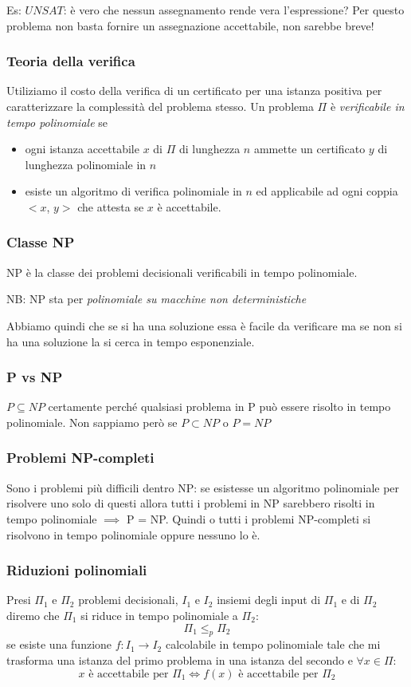 Es: $UNSAT$: è vero che nessun assegnamento rende vera l'espressione? Per questo problema non basta fornire un assegnazione accettabile, non sarebbe breve!

\subsubsection{Teoria della verifica}
Utiliziamo il costo della verifica di un certificato per una istanza positiva per caratterizzare la complessità del problema stesso. Un problema $\Pi$ è \emph{verificabile in tempo polinomiale} se
\begin{itemize}
    \item ogni istanza accettabile $x$ di $\Pi$ di lunghezza $n$ ammette un certificato $y$ di lunghezza polinomiale in $n$
    \item esiste un algoritmo di verifica polinomiale in $n$ ed applicabile ad ogni coppia $<x$, $y>$ che attesta se $x$ è accettabile.
\end{itemize}


\subsubsection{Classe NP}
NP è la classe dei problemi decisionali verificabili in tempo polinomiale.

NB: NP sta per \emph{polinomiale su macchine non deterministiche}

Abbiamo quindi che se si ha una soluzione essa è facile da verificare ma se non si ha una soluzione la si cerca in tempo esponenziale.

\subsubsection{P vs NP}
$P \subseteq NP$ certamente perché qualsiasi problema in P può essere risolto in tempo polinomiale. Non sappiamo però se $P \subset NP$ o $P = NP$


\subsubsection{Problemi NP-completi}
Sono i problemi più difficili dentro NP: se esistesse un algoritmo polinomiale per risolvere uno solo di questi allora tutti i problemi in NP sarebbero risolti in tempo polinomiale $\implies$ P = NP. Quindi o tutti i problemi NP-completi si risolvono in tempo polinomiale oppure nessuno lo è.

\subsubsection{Riduzioni polinomiali}
Presi $\Pi_{1}$ e $\Pi_{2}$ problemi decisionali, $I_{1}$ e $I_{2}$ insiemi degli input di $\Pi_{1}$ e di $\Pi_{2}$ diremo che $\Pi_{1}$ si riduce in tempo polinomiale a $\Pi_{2}$:
$$ \Pi_{1} \leq_{p} \Pi_{2} $$
se esiste una funzione $f:I_{1} \longrightarrow I_{2}$ calcolabile in tempo polinomiale tale che mi trasforma una istanza del primo problema in una istanza del secondo e $\forall x \in \Pi$:
$$ x \text{ è accettabile per } \Pi_{1} \Longleftrightarrow f(x) \text{ è accettabile per } \Pi_{2} $$

